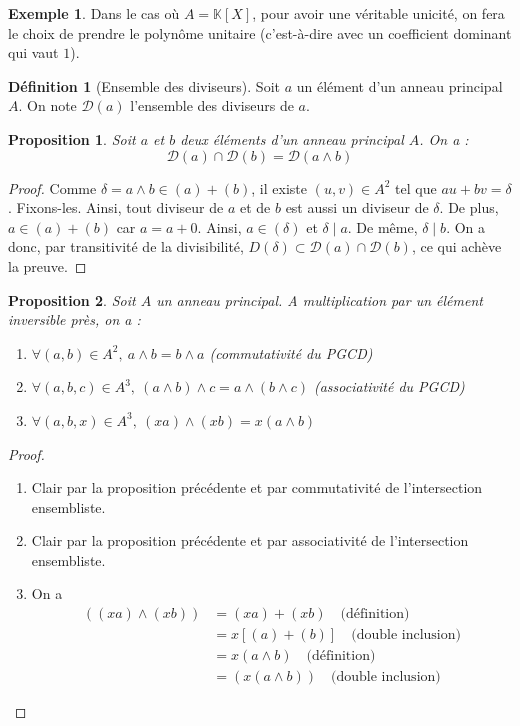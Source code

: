 \documentclass[french]{book}
\newcommand{\K}{\mathbb{K}}
\theoremstyle{plain}
\newtheorem{prop}{Proposition}[chapter]
\theoremstyle{definition}
\newtheorem{dfn}{Définition}[chapter]
\newtheorem{exa}{Exemple}[chapter]
\theoremstyle{remark}
\begin{document}
\begin{exa}
	Dans le cas où $A=\K[X]$, pour avoir une véritable unicité, on fera le choix de prendre le polynôme unitaire (c'est-à-dire avec un coefficient dominant qui vaut $1$).
\end{exa}
\begin{dfn}[Ensemble des diviseurs]
	Soit $a$ un élément d'un anneau principal $A$. On note $\mathcal{D}(a)$ l'ensemble des diviseurs de $a$.
\end{dfn}
\begin{prop}
	Soit $a$ et $b$ deux éléments d'un anneau principal $A$. On a : $$\mathcal{D}(a)\cap\mathcal{D}(b)=\mathcal{D}(a\wedge b)$$
\end{prop}
\begin{proof}
	Comme $\delta=a\wedge b\in(a)+(b)$, il existe $(u,v)\in A^2$ tel que $au+bv=\delta$. Fixons-les. Ainsi, tout diviseur de $a$ et de $b$  est aussi un diviseur de $\delta$. De plus, $a\in(a)+(b)$ car $a=a+0$. Ainsi, $a\in(\delta)$ et $\delta\mid a$. De même, $\delta\mid b$. On a donc, par transitivité de la divisibilité, $D(\delta)\subset\mathcal{D}(a)\cap\mathcal{D}(b)$, ce qui achève la preuve.
\end{proof}
\begin{prop}
	Soit $A$ un anneau principal. A multiplication par un élément inversible près, on a :
	\begin{enumerate}
		\item $\forall (a,b)\in A^2,\ a\wedge b=b\wedge a$ (commutativité du PGCD)
		\item $\forall (a,b,c)\in A^3,\ (a\wedge b)\wedge c=a\wedge(b\wedge c)$ (associativité du PGCD)
		\item $\forall (a,b,x)\in A^3,\ (xa)\wedge(xb)=x(a\wedge b)$
	\end{enumerate}
\end{prop}
\begin{proof}
	\begin{enumerate}
		\item Clair par la proposition précédente et par commutativité de l'intersection ensembliste.
		\item Clair par la proposition précédente et par associativité de l'intersection ensembliste.
		\item On a \begin{align*}
			((xa)\wedge(xb))&=(xa)+(xb)\quad\text{(définition)}\\
			&=x[(a)+(b)]\quad\text{(double inclusion)}\\
			&=x(a\wedge b)\quad\text{(définition)}\\
			&=(x(a\wedge b))\quad\text{(double inclusion)}
		\end{align*}
	\end{enumerate}
\end{proof}
\end{document}
